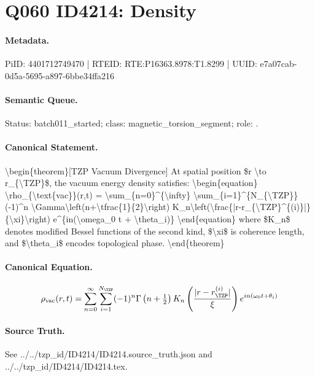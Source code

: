 \section*{Q060 ID4214: Density}
\paragraph{Metadata.}
PiID: 4401712749470 | RTEID: RTE:P16363.8978:T1.8299 | UUID: e7a07cab-0d5a-5695-a897-6bbe34ffa216

\paragraph{Semantic Queue.}
Status: batch011\_started; class: magnetic\_torsion\_segment; role: .

\paragraph{Canonical Statement.}
\textbackslash{}begin\{theorem\}[TZP Vacuum Divergence] At spatial position \$r \textbackslash{}to r\_\{\textbackslash{}TZP\}\$, the vacuum energy density satisfies: \textbackslash{}begin\{equation\} \textbackslash{}rho\_\{\textbackslash{}text\{vac\}\}(r,t) = \textbackslash{}sum\_\{n=0\}\textasciicircum{}\{\textbackslash{}infty\} \textbackslash{}sum\_\{i=1\}\textasciicircum{}\{N\_\{\textbackslash{}TZP\}\} (-1)\textasciicircum{}n \textbackslash{}Gamma\textbackslash{}left(n+\textbackslash{}tfrac\{1\}\{2\}\textbackslash{}right) K\_n\textbackslash{}left(\textbackslash{}frac\{|r-r\_\{\textbackslash{}TZP\}\textasciicircum{}\{(i)\}|\}\{\textbackslash{}xi\}\textbackslash{}right) e\textasciicircum{}\{in(\textbackslash{}omega\_0 t + \textbackslash{}theta\_i)\} \textbackslash{}end\{equation\} where \$K\_n\$ denotes modified Bessel functions of the second kind, \$\textbackslash{}xi\$ is coherence length, and \$\textbackslash{}theta\_i\$ encodes topological phase. \textbackslash{}end\{theorem\}

\paragraph{Canonical Equation.}
\[
\begin{equation} \rho_{\text{vac}}(r,t) = \sum_{n=0}^{\infty} \sum_{i=1}^{N_{\TZP}} (-1)^n \Gamma\left(n+\tfrac{1}{2}\right) K_n\left(\frac{|r-r_{\TZP}^{(i)}|}{\xi}\right) e^{in(\omega_0 t + \theta_i)} \end{equation}
\]

\paragraph{Source Truth.}
See ../../tzp\_id/ID4214/ID4214.source\_truth.json and ../../tzp\_id/ID4214/ID4214.tex.
